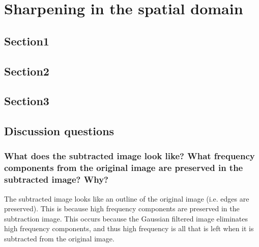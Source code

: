 \section{Sharpening in the spatial domain}

\subsection{Section1}
\begin{figure}[ht]
\centering
\end{figure}

\subsection{Section2}
\begin{figure}[ht]
\centering
\end{figure}


\subsection{Section3}
\begin{figure}[ht]
\centering
\end{figure}

\begin{figure}[ht]
\centering
\end{figure}

\subsection{Discussion questions}

\subsubsection{What does the subtracted image look like? What frequency components from the original image are
preserved in the subtracted image? Why?}
The subtracted image looks like an outline of the original image (i.e. edges are preserved). This is because high frequency components are preserved in the subtraction image. This occurs because the Gaussian filtered image eliminates high frequency components, and thus high frequency is all that is left when it is subtracted from the original image.


